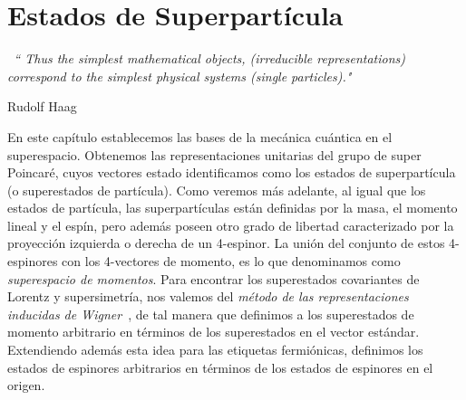 \chapter{Estados de Superpartícula}
\label{chap:2}
\epigraph{\textit{   \qquad \qquad  \quad \, ``    Thus the simplest  mathematical objects, (irreducible representations) correspond to the simplest physical systems (single particles)."}}{Rudolf Haag~\cite{Haag:2010zz}}


En este  capítulo establecemos las bases de la mecánica cuántica en el superespacio. Obtenemos las representaciones  unitarias del grupo de super Poincaré, cuyos vectores estado identificamos como los estados de superpartícula (o superestados de partícula). Como veremos más adelante, al igual que los estados de partícula, las superpartículas están definidas por la masa, el momento lineal y  el espín, pero además poseen otro grado de libertad caracterizado  por la  proyección izquierda o derecha de un 4-espinor. La unión del  conjunto  de estos 4-espinores con los 4-vectores de momento,  es lo que denominamos como \emph{superespacio de momentos}. Para encontrar los superestados covariantes de Lorentz y supersimetría, nos valemos del \emph{método de las representaciones inducidas de Wigner}~\cite{Wigner:1939cj}, de tal manera que definimos a los superestados de momento arbitrario en términos de los superestados en el vector estándar. Extendiendo además esta idea para las etiquetas fermiónicas, definimos  los estados de espinores arbitrarios en términos de los estados de espinores en el origen. 


